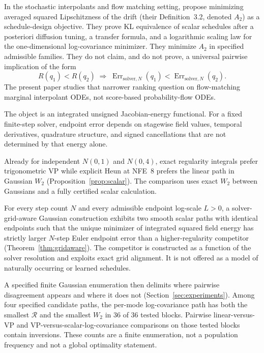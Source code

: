 \documentclass[11pt,a4paper]{article}
\theoremstyle{remark}
\newcommand{\wtwo}{W_2}
\newcommand{\cR}{\mathcal{R}}
\begin{document}
In the stochastic interpolants and flow matching setting,
\citet{lipschitzguided2025} propose minimizing averaged squared
Lipschitzness of the drift (their Definition~3.2, denoted $A_2$) as a
schedule-design objective. They prove KL equivalence of scalar schedules after a
posteriori diffusion tuning, a transfer formula, and a logarithmic
scaling law for the one-dimensional log-covariance minimizer. They
minimize $A_2$ in specified admissible families. They do not claim, and
do not prove, a universal pairwise implication of the form
\begin{equation}
  R(q_1)<R(q_2)
  \;\Longrightarrow\;
  \operatorname{Err}_{\mathrm{solver},N}(q_1)
  <
  \operatorname{Err}_{\mathrm{solver},N}(q_2).
\end{equation}
The present paper studies that narrower ranking question on
flow-matching marginal interpolant ODEs, not score-based probability-flow
ODEs.

The object is an integrated unsigned Jacobian-energy functional. For a
fixed finite-step solver, endpoint error depends on stagewise field
values, temporal derivatives, quadrature structure, and signed
cancellations that are not determined by that energy alone.

Already for independent $N(0,1)$ and $N(0,4)$, exact regularity integrals
prefer trigonometric VP while explicit Heun at NFE~$8$ prefers the linear
path in Gaussian $\wtwo$ (Proposition~\ref{prop:scalar}). The comparison
uses exact $W_2$ between Gaussians and a fully certified scalar
calculation.

For every step count $N$ and every admissible endpoint log-scale $L>0$,
a solver-grid-aware Gaussian construction exhibits two smooth scalar
paths with identical endpoints such that the unique minimizer of
integrated squared field energy has strictly larger $N$-step Euler
endpoint error than a higher-regularity competitor
(Theorem~\ref{thm:gridaware}). The competitor is constructed as a
function of the solver resolution and exploits exact grid alignment. It
is not offered as a model of naturally occurring or learned schedules.

A specified finite Gaussian enumeration then delimits where pairwise
disagreement appears and where it does not
(Section~\ref{sec:experiments}). Among four specified candidate paths,
the per-mode log-covariance path has both the smallest $\cR$ and the
smallest $\wtwo$ in $36$ of $36$ tested blocks. Pairwise linear-versus-VP
and VP-versus-scalar-log-covariance comparisons on those tested blocks
contain inversions. These counts are a finite enumeration, not a
population frequency and not a global optimality statement.
\end{document}
